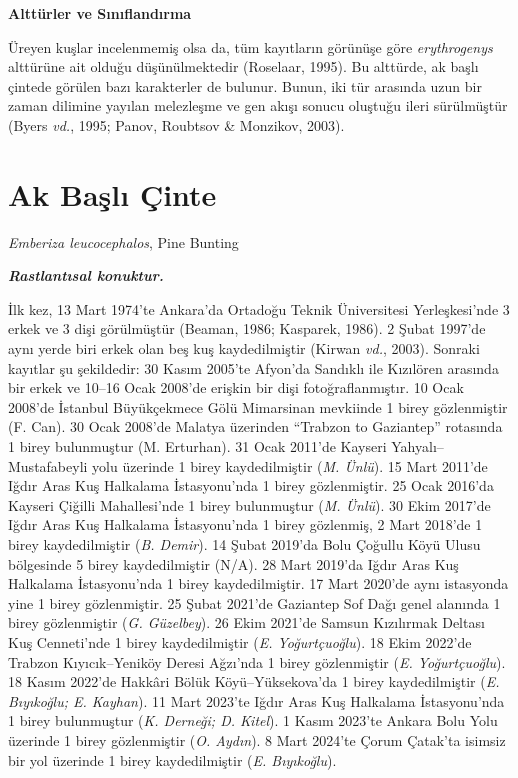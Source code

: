 \documentclass[
  10.5pt,
  a4paper,
  DIV=11,
  numbers=noendperiod,
  twocolumn]{scrreprt}
\begin{document}
\textbf{Alttürler ve Sınıflandırma}

Üreyen kuşlar incelenmemiş olsa da, tüm kayıtların görünüşe göre
\emph{erythrogenys} alttürüne ait olduğu düşünülmektedir (Roselaar,
1995). Bu alttürde, ak başlı çintede görülen bazı karakterler de
bulunur. Bunun, iki tür arasında uzun bir zaman dilimine yayılan
melezleşme ve gen akışı sonucu oluştuğu ileri sürülmüştür (Byers
\emph{vd.}, 1995; Panov, Roubtsov \& Monzikov, 2003).

\section{Ak Başlı Çinte}\label{ak-baux15flux131-uxe7inte}

\emph{Emberiza leucocephalos}, Pine Bunting

\textbf{\emph{Rastlantısal konuktur.}}

İlk kez, 13 Mart 1974'te Ankara'da Ortadoğu Teknik Üniversitesi
Yerleşkesi'nde 3 erkek ve 3 dişi görülmüştür (Beaman, 1986; Kasparek,
1986). 2 Şubat 1997'de aynı yerde biri erkek olan beş kuş kaydedilmiştir
(Kirwan \emph{vd.}, 2003). Sonraki kayıtlar şu şekildedir: 30 Kasım
2005'te Afyon'da Sandıklı ile Kızılören arasında bir erkek ve 10--16
Ocak 2008'de erişkin bir dişi fotoğraflanmıştır. 10 Ocak 2008'de
İstanbul Büyükçekmece Gölü Mimarsinan mevkiinde 1 birey gözlenmiştir (F.
Can). 30 Ocak 2008'de Malatya üzerinden ``Trabzon to Gaziantep''
rotasında 1 birey bulunmuştur (M. Erturhan). 31 Ocak 2011'de Kayseri
Yahyalı--Mustafabeyli yolu üzerinde 1 birey kaydedilmiştir (\emph{M.
Ünlü}). 15 Mart 2011'de Iğdır Aras Kuş Halkalama İstasyonu'nda 1 birey
gözlenmiştir. 25 Ocak 2016'da Kayseri Çiğilli Mahallesi'nde 1 birey
bulunmuştur (\emph{M. Ünlü}). 30 Ekim 2017'de Iğdır Aras Kuş Halkalama
İstasyonu'nda 1 birey gözlenmiş, 2 Mart 2018'de 1 birey kaydedilmiştir
(\emph{B. Demir}). 14 Şubat 2019'da Bolu Çoğullu Köyü Ulusu bölgesinde 5
birey kaydedilmiştir (N/A). 28 Mart 2019'da Iğdır Aras Kuş Halkalama
İstasyonu'nda 1 birey kaydedilmiştir. 17 Mart 2020'de aynı istasyonda
yine 1 birey gözlenmiştir. 25 Şubat 2021'de Gaziantep Sof Dağı genel
alanında 1 birey gözlenmiştir (\emph{G. Güzelbey}). 26 Ekim 2021'de
Samsun Kızılırmak Deltası Kuş Cenneti'nde 1 birey kaydedilmiştir
(\emph{E. Yoğurtçuoğlu}). 18 Ekim 2022'de Trabzon Kıyıcık--Yeniköy
Deresi Ağzı'nda 1 birey gözlenmiştir (\emph{E. Yoğurtçuoğlu}). 18 Kasım
2022'de Hakkâri Bölük Köyü--Yüksekova'da 1 birey kaydedilmiştir
(\emph{E. Bıyıkoğlu; E. Kayhan}). 11 Mart 2023'te Iğdır Aras Kuş
Halkalama İstasyonu'nda 1 birey bulunmuştur (\emph{K. Derneği; D.
Kitel}). 1 Kasım 2023'te Ankara Bolu Yolu üzerinde 1 birey gözlenmiştir
(\emph{O. Aydın}). 8 Mart 2024'te Çorum Çatak'ta isimsiz bir yol
üzerinde 1 birey kaydedilmiştir (\emph{E. Bıyıkoğlu}).
\end{document}
